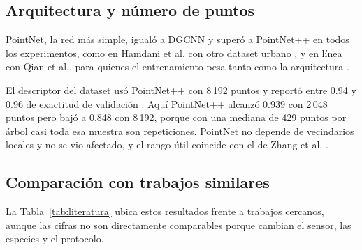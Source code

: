 \documentclass[preprint,12pt]{elsarticle}
\begin{document}
\subsection{Arquitectura y número de puntos}

PointNet, la red más simple, igualó a DGCNN y superó a PointNet++ en todos los experimentos, como en Hamdani et al. con otro dataset urbano \cite{hamdani2026classification}, y en línea con Qian et al., para quienes el entrenamiento pesa tanto como la arquitectura \cite{qian2022pointnext}.

El descriptor del dataset usó PointNet++ con 8\,192 puntos y reportó entre 0.94 y 0.96 de exactitud de validación \cite{hamdani2026urbantree3d}. Aquí PointNet++ alcanzó 0.939 con 2\,048 puntos pero bajó a 0.848 con 8\,192, porque con una mediana de 429 puntos por árbol casi toda esa muestra son repeticiones. PointNet no depende de vecindarios locales y no se vio afectado, y el rango útil coincide con el de Zhang et al. \cite{zhang2025uav}.

\subsection{Comparación con trabajos similares}

La Tabla~\ref{tab:literatura} ubica estos resultados frente a trabajos cercanos, aunque las cifras no son directamente comparables porque cambian el sensor, las especies y el protocolo.
\end{document}
